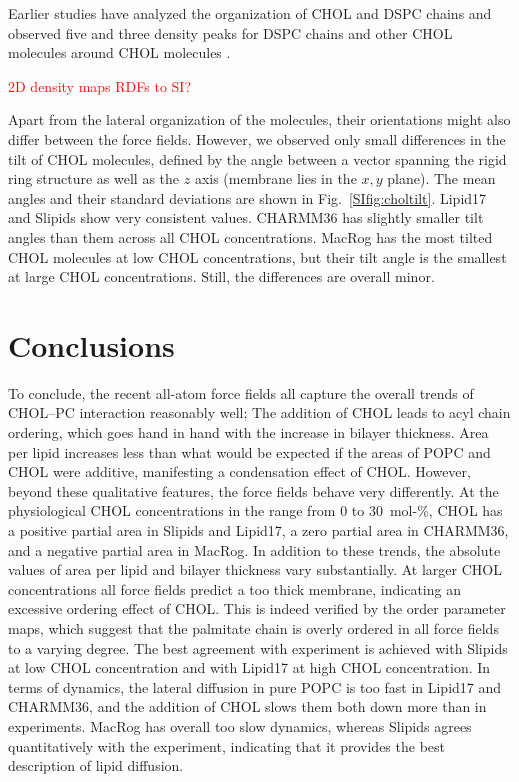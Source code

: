 \documentclass[journal=jctcce]{achemso}
\begin{document}
Earlier studies have analyzed the organization of CHOL and DSPC chains and observed five and three density peaks for DSPC chains and other CHOL molecules around CHOL molecules \cite{martinez2010cholesterol}. 

\textcolor{red}{2D density maps}
\textcolor{red}{RDFs to SI?}

Apart from the lateral organization of the molecules, their orientations might also differ between the force fields. However, we observed only small differences in the tilt of CHOL molecules, defined by the angle between a vector spanning the rigid ring structure as well as the $z$ axis (membrane lies in the $x,y$ plane). The mean angles and their standard deviations are shown in Fig.~\ref{SIfig:choltilt}. Lipid17 and Slipids show very consistent values. CHARMM36 has slightly smaller tilt angles than them across all CHOL concentrations. MacRog has the most tilted CHOL molecules at low CHOL concentrations, but their tilt angle is the smallest at large CHOL concentrations. Still, the differences are overall minor.

\section{Conclusions}

To conclude, the recent all-atom force fields all capture the overall trends of CHOL--PC interaction reasonably well; The addition of CHOL leads to acyl chain ordering, which goes hand in hand with the increase in bilayer thickness. Area per lipid increases less than what would be expected if the areas of POPC and CHOL were additive, manifesting a condensation effect of CHOL. However, beyond these qualitative features, the force fields behave very differently. At the physiological CHOL concentrations in the range from 0 to 30~mol-\%, CHOL has a positive partial area in Slipids and Lipid17, a zero partial area in CHARMM36, and a negative partial area in MacRog. In addition to these trends, the absolute values of area per lipid and bilayer thickness vary substantially. At larger CHOL concentrations all force fields predict a too thick membrane, indicating an excessive ordering effect of CHOL. This is indeed verified by the order parameter maps, which suggest that the palmitate chain is overly ordered in all force fields to a varying degree. The best agreement with experiment is achieved with Slipids at low CHOL concentration and with Lipid17 at high CHOL concentration. In terms of dynamics, the lateral diffusion in pure POPC is too fast in Lipid17 and CHARMM36, and the addition of CHOL slows them both down more than in experiments. MacRog has overall too slow dynamics, whereas Slipids agrees quantitatively with the experiment, indicating that it provides the best description of lipid diffusion.
\end{document}
